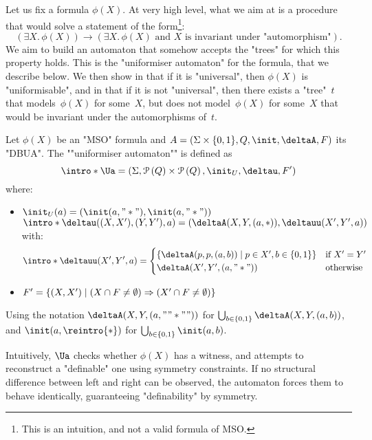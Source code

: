 \documentclass[a4paper,UKenglish,cleveref, autoref, thm-restate]{lipics-v2021}
\begin{document}
Let us fix a formula $\phi(X)$. At very high level, what we aim at is a procedure that would solve a statement of the form\footnote{This is an intuition, and not a valid formula of MSO.}:
\[
	(\exists X.\, \phi(X)) \rightarrow (\exists X.\, \phi(X) \text{ and $X$ is invariant under "automorphism"}).
\]
We aim to build an automaton that somehow accepts the "trees" for which this property holds.
This is the "uniformiser automaton" for the formula, that we describe below. We then show in  that if it is "universal",
then $\phi(X)$ is "uniformisable", and in  that if it is not "universal", then there exists a
"tree"~$t$ that models~$\phi(X)$ for some~$X$, but does not model~$\phi(X)$ for some~$X$ that would be invariant under the automorphisms of~$t$.
\begin{definition}
	\AP Let $\phi(X)$ be an "MSO" formula and $A = (\Sigma \times \{0,1\}, Q, \init, \deltaA, F)$ its "DBUA". The ""uniformiser automaton"" is defined as
	\[
		\intro* \Ua = (\Sigma, \parts{Q} \times \parts{Q}, \init_U, \deltau, F')
	\]
	where:
	\begin{itemize}
		\item $\init_U(a) = (\init(a,"*"), \init(a,"*"))$
		      \itemAP $\intro*\deltau((X,X'),(Y,Y'),a) = (\deltaA(X,Y,(a,*)), \deltauu(X',Y',a))$ with:
		      \[
			      \intro*\deltauu(X',Y',a) = \begin{cases}
				      \setdef{\deltaA(p,p,(a,b))}{p \in X', b \in \set{0,1}} & \text{if } X' = Y' \\
				      \deltaA(X',Y',(a,"*"))                                 & \text{otherwise}
			      \end{cases}
		      \]
		\item $F' = \left\{(X,X') \mid (X \cap F \neq \emptyset) \Rightarrow (X' \cap F \neq \emptyset)\right\}$
	\end{itemize}
	\AP Using the notation $\deltaA(X,Y,(a,""*""))$ for $\bigcup_{b \in \set{0,1}} \deltaA(X,Y,(a,b))$, and $\init(a,\reintro{*})$ for $\bigcup_{b \in \set{0,1}} \init(a,b)$.
\end{definition}


Intuitively, $\Ua$ checks whether $\phi(X)$ has a witness, and attempts to reconstruct a "definable" one using symmetry constraints.
If no structural difference between left and right can be observed, the automaton forces them to behave identically, guaranteeing
"definability" by symmetry.
\end{document}
